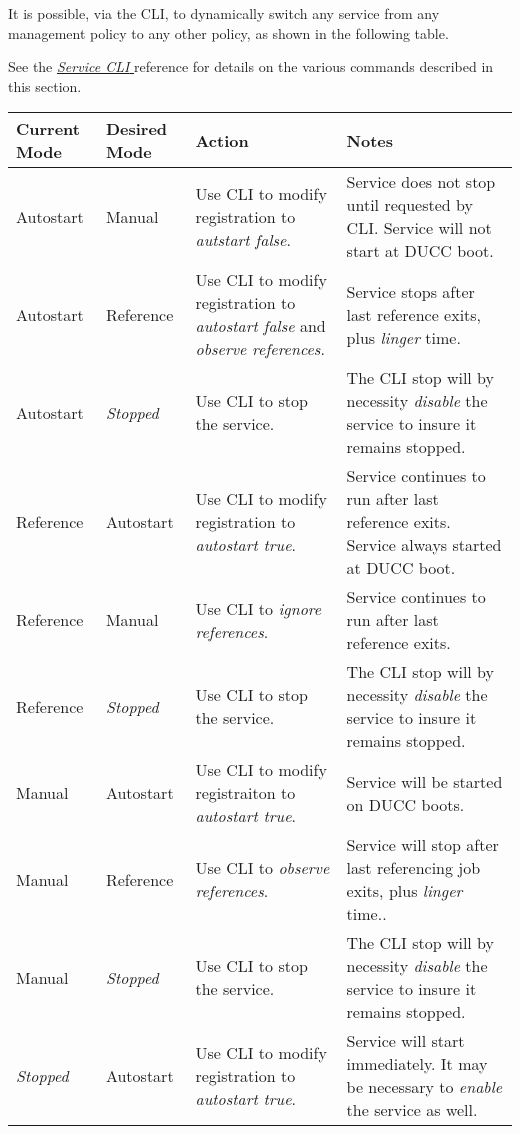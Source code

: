       It is possible, via the CLI, to dynamically switch any service from any management policy
      to any other policy, as shown in the following table.

      See the \hyperref[sec:cli.ducc-services]{\em Service CLI } reference for details on the various 
      commands described in this section.

      \begin{tabular}{| l | l | p{6cm} | p{6cm} |}
        \hline
        Current Mode & Desired Mode & Action & Notes \\
        \hline
        \hline
        Autostart    & Manual       & Use CLI to modify registration to {\em autstart false}. & Service does not stop until requested by CLI. Service will not start at DUCC boot.\\
        \hline
        Autostart    & Reference    & Use CLI to modify registration to {\em autostart false} and {\em observe references}. & Service stops  after last reference exits, plus {\em linger} time.\\
        \hline
        Autostart    & {\em Stopped} & Use CLI to stop the service. & The CLI stop will by necessity {\em disable} the service to insure it remains stopped. \\
        \hline
        Reference    & Autostart    & Use CLI to modify registration to {\em autostart true}. & Service continues to run after last reference exits.  Service always started at DUCC boot. \\
        \hline
        Reference    & Manual       & Use CLI to {\em ignore references}. & Service continues to run after last reference exits. \\
        \hline
        Reference    & {\em Stopped} & Use CLI to stop the service. & The CLI stop will by necessity {\em disable} the service to insure it remains stopped. \\
        \hline
        Manual       & Autostart    & Use CLI to modify registraiton to {\em autostart true}. & Service will be started on DUCC boots. \\
        \hline
        Manual       & Reference    & Use CLI to {\em observe references}. & Service will stop after last referencing job exits, plus {\em linger} time.. \\
        \hline
        Manual      & {\em Stopped} & Use CLI to stop the service. & The CLI stop will by necessity {\em disable} the service to insure it remains stopped. \\
        \hline
        {\em Stopped} & Autostart    & Use CLI to modify registration to {\em autostart true}. & Service will start immediately. It may be necessary to {\em enable} the service as well.\\

\end{tabular}
